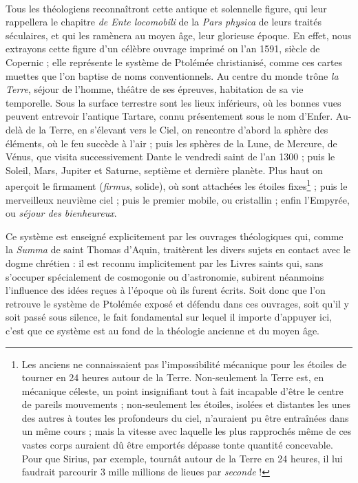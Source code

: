 \documentclass[a4paper, 11pt, oneside]{article}
\begin{document}
\paragraph{}
Tous les théologiens reconnaîtront cette antique et solennelle figure, qui leur rappellera le chapitre \emph{de Ente locomobili} de la \emph{Pars physica} de leurs traités séculaires, et qui les ramènera au moyen âge, leur glorieuse époque. En effet, nous extrayons cette figure d'un célèbre ouvrage imprimé on l'an 1591, siècle de Copernic ; elle représente le système de Ptolémée christianisé, comme ces cartes muettes que l'on baptise de noms conventionnels. Au centre du monde trône \emph{la Terre}, séjour de l'homme, théâtre de ses épreuves, habitation de sa vie temporelle. Sous la surface terrestre sont les lieux inférieurs, où les bonnes vues peuvent entrevoir l'antique Tartare, connu présentement sous le nom d'Enfer. Au-delà de la Terre, en s'élevant vers le Ciel, on rencontre d'abord la sphère des éléments, où le feu succède à l'air ; puis les sphères de la Lune, de Mercure, de Vénus, que visita successivement Dante le vendredi saint de l'an 1300 ; puis le Soleil, Mars, Jupiter et Saturne, septième et dernière planète. Plus haut on aperçoit le firmament (\emph{firmus}, solide), où sont attachées les étoiles fixes\footnote{Les anciens ne connaissaient pas l'impossibilité mécanique pour les étoiles de tourner en 24 heures autour de la Terre. Non-seulement la Terre est, en mécanique céleste, un point insignifiant tout à fait incapable d'être le centre de pareils mouvements ; non-seulement les étoiles, isolées et distantes les unes des autres à toutes les profondeurs du ciel, n'auraient pu être entraînées dans un même cours ; mais la vitesse avec laquelle les plus rapprochés même de ces vastes corps auraient dû être emportés dépasse tonte quantité concevable. Pour que Sirius, par exemple, tournât autour de la Terre en 24 heures, il lui faudrait parcourir 3 mille millions de lieues par \emph{seconde} !} ; puis le merveilleux neuvième ciel ; puis le premier mobile, ou cristallin ; enfin l'Empyrée, ou \emph{séjour des bienheureux}.

Ce système est enseigné explicitement par les ouvrages théologiques qui, comme la \emph{Summa} de saint Thomas d'Aquin, traitèrent les divers sujets en contact avec le dogme chrétien : il est reconnu implicitement par les Livres saints qui, sans s'occuper spécialement de cosmogonie ou d'astronomie, subirent néanmoins l'influence des idées reçues à l'époque où ils furent écrits. Soit donc que l'on retrouve le système de Ptolémée exposé et défendu dans ces ouvrages, soit qu'il y soit passé sous silence, le fait fondamental sur lequel il importe d'appuyer ici, c'est que ce système est au fond de la théologie ancienne et du moyen âge.
\end{document}
